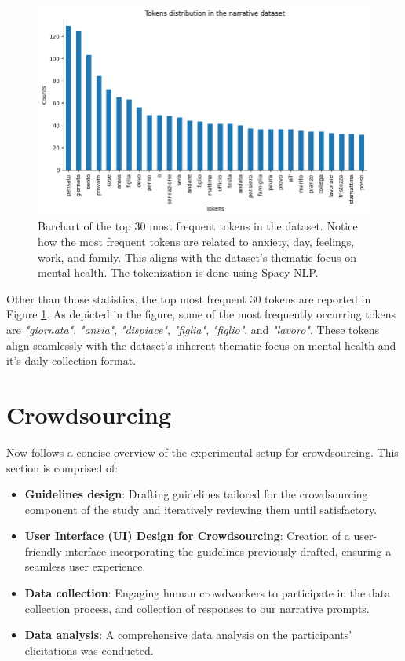 \begin{figure}[!htbp]
    \centering
    \includegraphics[width=1\linewidth]{assets//imgs/dataset-top-30-prompt.png}
    \caption{Barchart of the top 30 most frequent tokens in the dataset. Notice how the most frequent tokens are related to anxiety, day, feelings, work, and family. This aligns with the dataset's thematic focus on mental health. The tokenization is done using Spacy NLP.}
    \label{fig:dataset-top-30-prompt}
\end{figure}

Other than those statistics, the top most frequent 30 tokens are reported in Figure \ref{fig:dataset-top-30-prompt}. As depicted in the figure, some of the most frequently occurring tokens are \emph{"giornata"}, \emph{"ansia"},  \emph{"dispiace"},  \emph{"figlia"},  \emph{"figlio"}, and  \emph{"lavoro"}. These tokens align seamlessly with the dataset's inherent thematic focus on mental health and it's daily collection format.

\section{Crowdsourcing}
Now follows a concise overview of the experimental setup for crowdsourcing. This section is comprised of:
\begin{itemize}
    \item \textbf{Guidelines design}: Drafting guidelines tailored for the crowdsourcing component of the study and iteratively reviewing them until satisfactory.
    \item \textbf{User Interface (UI) Design for Crowdsourcing}: Creation of a user-friendly interface incorporating the guidelines previously drafted, ensuring a seamless user experience.
    \item \textbf{Data collection}: Engaging human crowdworkers to participate in the data collection process, and collection of responses to our narrative prompts.
    \item \textbf{Data analysis}: A comprehensive data analysis on the participants' elicitations was conducted.
\end{itemize}
